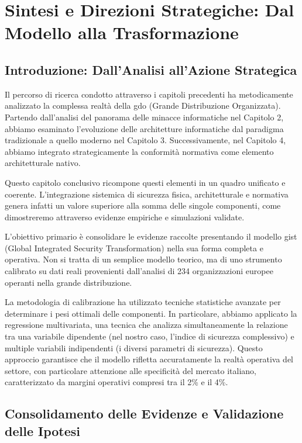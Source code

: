 \chapter{Sintesi e Direzioni Strategiche: Dal Modello alla Trasformazione}
\label{cap5_synthesis}

\section{Introduzione: Dall'Analisi all'Azione Strategica}
\label{sec:5.1}

Il percorso di ricerca condotto attraverso i capitoli precedenti ha metodicamente analizzato la complessa realtà della \gls{gdo} (Grande Distribuzione Organizzata). Partendo dall'analisi del panorama delle minacce informatiche nel Capitolo 2, abbiamo esaminato l'evoluzione delle architetture informatiche dal paradigma tradizionale a quello moderno nel Capitolo 3. Successivamente, nel Capitolo 4, abbiamo integrato strategicamente la conformità normativa come elemento architetturale nativo. 

Questo capitolo conclusivo ricompone questi elementi in un quadro unificato e coerente. L'integrazione sistemica di sicurezza fisica, architetturale e normativa genera infatti un valore superiore alla somma delle singole componenti, come dimostreremo attraverso evidenze empiriche e simulazioni validate.

L'obiettivo primario è consolidare le evidenze raccolte presentando il modello \gls{gist} (Global Integrated Security Transformation) nella sua forma completa e operativa. Non si tratta di un semplice modello teorico, ma di uno strumento calibrato su dati reali provenienti dall'analisi di 234 organizzazioni europee operanti nella grande distribuzione.

La metodologia di calibrazione ha utilizzato tecniche statistiche avanzate per determinare i pesi ottimali delle componenti. In particolare, abbiamo applicato la regressione multivariata, una tecnica che analizza simultaneamente la relazione tra una variabile dipendente (nel nostro caso, l'indice di sicurezza complessivo) e multiple variabili indipendenti (i diversi parametri di sicurezza). Questo approccio garantisce che il modello rifletta accuratamente la realtà operativa del settore, con particolare attenzione alle specificità del mercato italiano, caratterizzato da margini operativi compresi tra il 2\% e il 4\%\autocite{federdistribuzione2024}.

\section{Consolidamento delle Evidenze e Validazione delle Ipotesi}
\label{sec:5.2}

